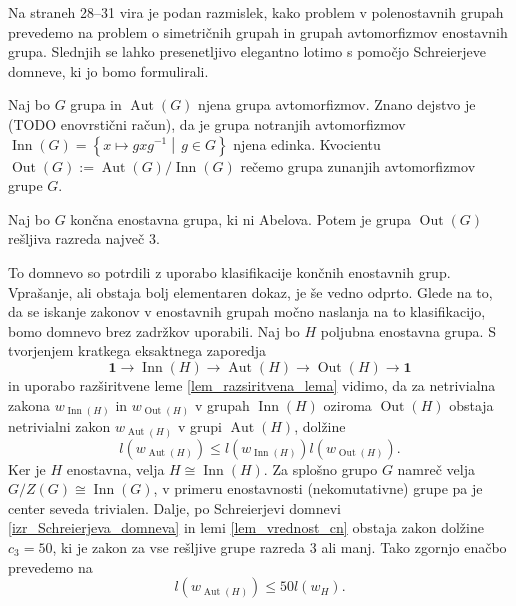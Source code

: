 \documentclass[mat1, tisk]{fmfdelo}
\numberwithin{equation}{section}  %
\begin{document}
Na straneh 28--31 vira \cite{Schneider_2016} je podan razmislek, kako problem v polenostavnih grupah prevedemo na problem o simetričnih grupah in grupah avtomorfizmov enostavnih grupa. Slednjih se lahko presenetljivo elegantno lotimo s pomočjo Schreierjeve domneve, ki jo bomo formulirali.

\begin{definicija}
\label{def_grupa_zunanjih_avtomorfizmov}
Naj bo $G$ grupa in $\operatorname{Aut}(G)$ njena grupa avtomorfizmov. Znano dejstvo je (TODO enovrstični račun), da je grupa notranjih avtomorfizmov $\operatorname{Inn}(G) = \left\{ x \mapsto g x g^{-1}  \middle|\,  g \in G  \right\}$ njena edinka.
Kvocientu $\operatorname{Out}(G) :=  \operatorname{Aut}(G)  /  \operatorname{Inn}(G)$ rečemo grupa zunanjih avtomorfizmov grupe $G$. 
\end{definicija}

\begin{izrek}
\label{izr_Schreierjeva_domneva}
 Naj bo $G$ končna enostavna grupa, ki ni Abelova. Potem je grupa $\operatorname{Out}(G)$ rešljiva razreda največ $3$.
\end{izrek}

To domnevo so potrdili z uporabo klasifikacije končnih enostavnih grup. Vprašanje, ali obstaja bolj elementaren dokaz, je še vedno odprto. %
Glede na to, da se iskanje zakonov v enostavnih grupah močno naslanja na to klasifikacijo, bomo domnevo brez zadržkov uporabili. Naj bo $H$ poljubna enostavna grupa. 
S tvorjenjem kratkega eksaktnega zaporedja \begin{equation*}
    \mathbf{1} \to \operatorname{Inn}(H)  \to \operatorname{Aut}(H)  \to  \operatorname{Out}(H)  \to  \mathbf{1}
\end{equation*}  
in uporabo razširitvene leme \ref{lem_razsiritvena_lema} vidimo, da za netrivialna zakona $w_{\operatorname{Inn}(H) }$ in $w_{\operatorname{Out}(H) }$ v grupah $\operatorname{Inn}(H) $ oziroma $\operatorname{Out}(H) $ obstaja netrivialni zakon $w_{\operatorname{Aut}(H) }$ v grupi $\operatorname{Aut}(H) $, dolžine \begin{equation*}
    l(w_{\operatorname{Aut}(H) }) \le  l(w_{\operatorname{Inn}(H) }) l (w_{ \operatorname{Out}(H) }).
    \end{equation*}    
Ker je $H$ enostavna, velja $H \cong \operatorname{Inn}(H)$. Za splošno grupo $G$ namreč velja $ G / Z(G) \cong \operatorname{Inn}(G)$, v primeru enostavnosti (nekomutativne) grupe pa je center seveda trivialen. Dalje, po Schreierjevi domnevi \ref{izr_Schreierjeva_domneva} in lemi \ref{lem_vrednost_cn} obstaja zakon dolžine $c_3 = 50$, ki je zakon za vse rešljive grupe razreda $3$ ali manj.
Tako zgornjo enačbo prevedemo na \begin{equation*}
    l(w_{\operatorname{Aut}(H) }) \le  50 l(w_H).
\end{equation*}  
\end{document}
